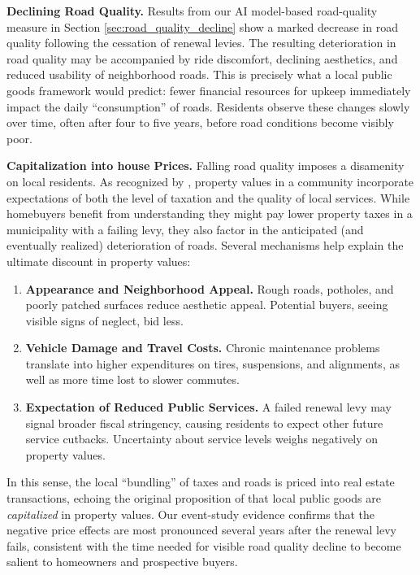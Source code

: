 {\bf Declining Road Quality.} Results from our AI model-based road-quality measure in Section \ref{sec:road_quality_decline} show a marked decrease in road quality following the cessation of renewal levies. The resulting deterioration in road quality may be accompanied by ride discomfort, declining aesthetics, and reduced usability of neighborhood roads. This is precisely what a local public goods framework would predict: fewer financial resources for upkeep immediately impact the daily “consumption” of roads. Residents observe these changes slowly over time, often after four to five years, before road conditions become visibly poor.

{\bf Capitalization into house Prices.} Falling road quality imposes a disamenity on local residents. As recognized by \cite{Oates1969}, property values in a community incorporate expectations of both the level of taxation and the quality of local services. While homebuyers benefit from understanding they might pay lower property taxes in a municipality with a failing levy, they also factor in the anticipated (and eventually realized) deterioration of roads. Several mechanisms help explain the ultimate discount in property values:

\begin{enumerate}
    \item \textbf{Appearance and Neighborhood Appeal.} Rough roads, potholes, and poorly patched surfaces reduce aesthetic appeal. Potential buyers, seeing visible signs of neglect, bid less.
    \item \textbf{Vehicle Damage and Travel Costs.} Chronic maintenance problems translate into higher expenditures on tires, suspensions, and alignments, as well as more time lost to slower commutes.
    \item \textbf{Expectation of Reduced Public Services.} A failed renewal levy may signal broader fiscal stringency, causing residents to expect other future service cutbacks. Uncertainty about service levels weighs negatively on property values. 
\end{enumerate}

\noindent In this sense, the local “bundling” of taxes and roads is priced into real estate transactions, echoing the original proposition of \cite{Tiebout1956} that local public goods are \emph{capitalized} in property values. Our event-study evidence confirms that the negative price effects are most pronounced several years after the renewal levy fails, consistent with the time needed for visible road quality decline to become salient to homeowners and prospective buyers.

